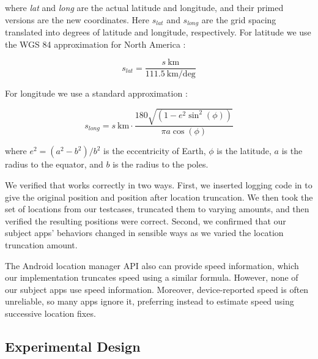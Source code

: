 \noindent where \textit{lat} and \textit{long} are the actual latitude and
longitude, and their primed versions are the new coordinates. Here
$s_\textit{lat}$ and $s_\textit{long}$ are the grid spacing translated
into degrees of latitude and longitude, respectively.
For latitude we use the WGS 84 approximation for North America \cite{latitude-calculator}:

\begin{displaymath}
s_\textit{lat} = \frac{s~\textrm{km}}{111.5~\textrm{km/deg}}
\end{displaymath}

For longitude we use a standard approximation \cite{rapp:geometric}:

\[
s_\textit{long} = s~\textrm{km} \cdot 
  \frac {180 \sqrt{(1 - e^2 \sin^2(\phi))}}
  {\pi a \cos(\phi)}
\]

\noindent where $e^2 = (a^2 - b^2)/b^2$ is the eccentricity of Earth, $\phi$ is
the latitude, $a$ is the radius to the
equator, and $b$ is the radius to the poles.

We verified that \fuzzer{} works correctly in two ways.  First, we 
inserted logging code in \fuzzer{} to give the original position and 
position after location truncation.  We then took the set of locations from our 
testcases, truncated them to varying amounts, and then verified the
resulting positions were correct.  Second, we confirmed that our subject apps'
behaviors changed in sensible ways as we varied the location truncation 
amount.

The Android location manager API also can provide speed information,
which our implementation truncates speed using a similar
formula. However, none of our subject apps use speed
information. Moreover, device-reported speed is often unreliable, so
many apps ignore it, preferring instead to estimate speed using
successive location fixes.

\subsection{Experimental Design}
\label{sec:design}

